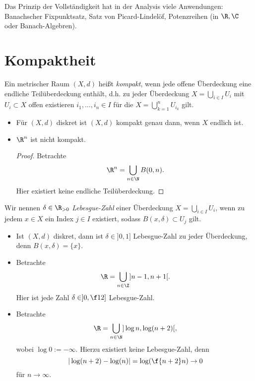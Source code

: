 Das Prinzip der Vollständigkeit hat in der Analysis viele Anwendungen: Banachscher Fixpunktsatz, Satz von Picard-Lindelöf, Potenzreihen (in $\R, \C$ oder Banach-Algebren).


\section{Kompaktheit}


\begin{df} \label{df:compact_space}
	Ein metrischer Raum $(X,d)$ heißt \emph{kompakt}, wenn jede offene Überdeckung eine endliche Teilüberdeckung enthält, d.h. zu jeder Überdeckung $X = \bigcup_{i \in I} U_i$ mit $U_i \subset X$ offen existieren $i_1, \dotsc, i_n \in I$ für die $X = \bigcup_{k=1}^n U_{i_k}$ gilt.
\end{df}

\begin{ex}
	\begin{itemize}
		\item
			Für $(X,d)$ diskret ist $(X,d)$ kompakt genau dann, wenn $X$ endlich ist.
		\item
			$\R^n$ ist nicht kompakt.
			\begin{proof}
				Betrachte
				\[
					\R^n = \bigcup_{n\in \N} B(0,n).
				\]
				Hier existiert keine endliche Teilüberdeckung.
			\end{proof}
	\end{itemize}
\end{ex}

\begin{df}
	Wir nennen $\delta \in \R_{>0}$ \emph{Lebesgue-Zahl} einer Überdeckung $X = \bigcup_{i\in I} U_i$,  wenn zu jedem $x \in X$ ein Index $j\in I$ existiert, sodass $B(x,\delta) \subset U_j$ gilt.
\end{df}

\begin{ex}
	\begin{itemize}
		\item
			Ist $(X,d)$ diskret, dann ist $\delta \in ]0,1]$ Lebesgue-Zahl zu jeder Überdeckung, denn $B(x,\delta) = \{x\}$.
		\item
			Betrachte
			\[
				\R = \bigcup_{n \in \Z} ]n-1, n+1[.
			\]
			Hier ist jede Zahl $\delta \in ]0,\f 12]$ Lebesgue-Zahl.
		\item
			Betrachte
			\[
				\R = \bigcup_{n\in\N} ] \log n, \log(n+2) [,
			\]
			wobei $\log 0 := -\infty$.
			Hierzu existiert keine Lebesgue-Zahl, denn
			\[
				|\log (n+2) - \log(n)| = \log (\f {n+2}n) \to 0
			\]
			für $n \to \infty$.
	\end{itemize}
\end{ex}

